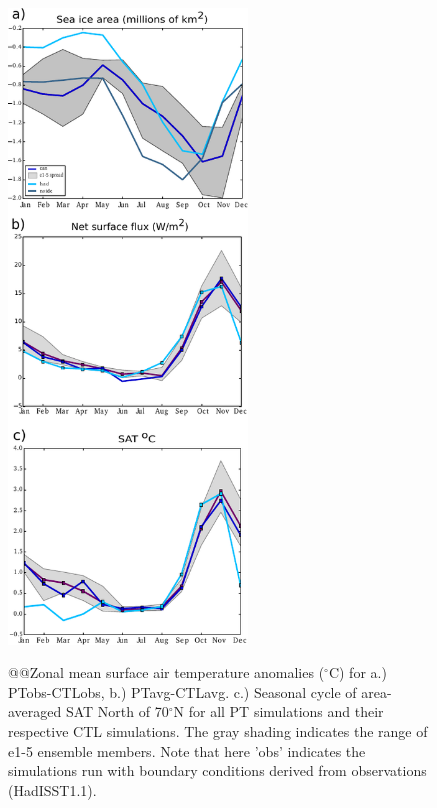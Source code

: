 \documentclass[twocol]{ametsoc}
\begin{document}
\begin{figure}[t]
  \noindent\includegraphics[width=15pc,angle=0]{seacycles.pdf}\\
  \caption{@@Zonal mean surface air temperature anomalies ($^\circ$C) for a.) PTobs-CTLobs, b.) PTavg-CTLavg. c.) Seasonal cycle of area-averaged SAT North of 70$^\circ$N for all PT simulations and their respective CTL simulations. The gray shading indicates the range of e1-5 ensemble members. Note that here 'obs' indicates the simulations run with boundary conditions derived from observations (HadISST1.1).
}\label{fig:fig2}
\end{figure}
\end{document}
